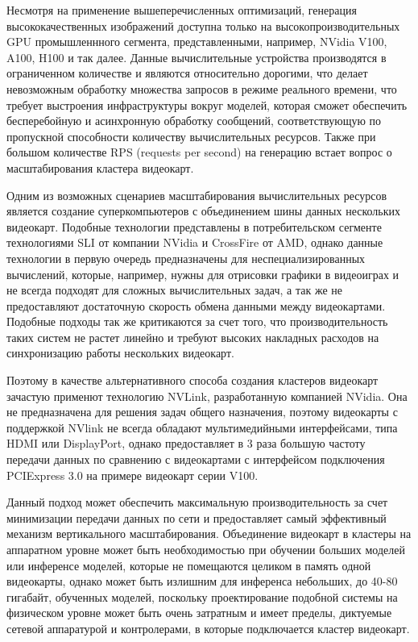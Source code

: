 Несмотря на применение вышеперечисленных оптимизаций,
генерация высококачественных изображений доступна только на высокопроизводительных GPU промышленнного сегмента,
представленными, например, NVidia V100, A100, H100 и так далее. 
Данные вычислительные устройства производятся в ограниченном количестве и являются относительно дорогими,
что делает невозможным обработку множества запросов в режиме реального времени, что требует выстроения инфраструктуры
вокруг моделей, которая сможет обеспечить бесперебойную и асинхронную обработку сообщений, 
соответствующую по пропускной способности количеству вычислительных ресурсов.
Также при большом количестве RPS (requests per second) на генерацию встает вопрос о масштабирования кластера
видеокарт. 

Одним из возможных сценариев масштабирования вычислительных ресурсов является создание суперкомпьютеров с объединением
шины данных нескольких видеокарт. Подобные технологии представлены в потребительском сегменте технологиями SLI от компании NVidia и CrossFire от AMD, однако
данные технологии в первую очередь предназначены для неспециализированных вычислений, которые, например, нужны для
отрисовки графики в видеоиграх и не всегда подходят для сложных вычислительных задач, а так же не предоставляют достаточную скорость
обмена данными между видеокартами. Подобные подходы так же критикаются за счет того, что производительность таких систем не растет линейно и
требуют высоких накладных расходов на синхронизацию работы нескольких видеокарт.

Поэтому в качестве альтернативного способа создания кластеров видеокарт зачастую применют технологию NVLink, разработанную 
компанией NVidia. Она не предназначена для решения задач общего назначения, поэтому видеокарты с поддержкой NVlink не всегда обладают 
мультимедийными интерфейсами, типа HDMI или DisplayPort, однако предоставляет в 3 раза большую частоту передачи данных
по сравнению с видеокартами с интерфейсом подключения PCIExpress 3.0 на примере видеокарт серии V100.

Данный подход может обеспечить максимальную производительность за счет минимизации передачи данных по сети
и предоставляет самый эффективный механизм вертикального масштабирования. Объединение видеокарт в кластеры на аппаратном
уровне может быть необходимостью при обучении больших моделей или инференсе моделей, которые не помещаются целиком
в память одной видеокарты, однако может быть излишним для инференса небольших, до 40-80 гигабайт, обученных моделей,
поскольку проектирование подобной системы на физическом уровне может быть очень затратным и имеет пределы, диктуемые
сетевой аппаратурой и контролерами, в которые подключается кластер видеокарт.

